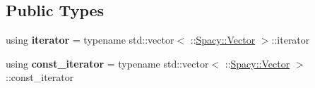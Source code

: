 \subsection*{Public Types}
\begin{DoxyCompactItemize}
\item 
using {\bfseries iterator} = typename std\+::vector$<$ \+::\hyperlink{classSpacy_1_1Vector}{Spacy\+::\+Vector} $>$\+::iterator\hypertarget{classSpacy_1_1ProductSpace_1_1Vector_ab7f65b8325dfda9af3ad4446219990e0}{}\label{classSpacy_1_1ProductSpace_1_1Vector_ab7f65b8325dfda9af3ad4446219990e0}

\item 
using {\bfseries const\+\_\+iterator} = typename std\+::vector$<$ \+::\hyperlink{classSpacy_1_1Vector}{Spacy\+::\+Vector} $>$\+::const\+\_\+iterator\hypertarget{classSpacy_1_1ProductSpace_1_1Vector_a5f2f1a2183b6074971de4ef0284c23e4}{}\label{classSpacy_1_1ProductSpace_1_1Vector_a5f2f1a2183b6074971de4ef0284c23e4}

\end{DoxyCompactItemize}
